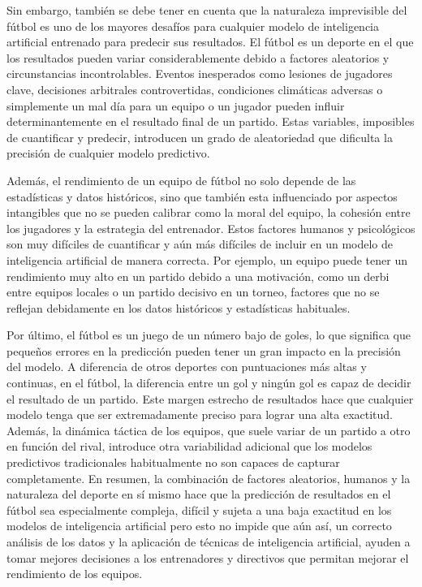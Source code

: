 Sin embargo, también se debe tener en cuenta que la naturaleza imprevisible del fútbol es uno de los mayores desafíos para cualquier modelo de inteligencia artificial entrenado para predecir sus resultados. El fútbol es un deporte en el que los resultados pueden variar considerablemente debido a factores aleatorios y circunstancias incontrolables. Eventos inesperados como lesiones de jugadores clave, decisiones arbitrales controvertidas, condiciones climáticas adversas o simplemente un mal día para un equipo o un jugador pueden influir determinantemente en el resultado final de un partido. Estas variables, imposibles de cuantificar y predecir, introducen un grado de aleatoriedad que dificulta la precisión de cualquier modelo predictivo.

Además, el rendimiento de un equipo de fútbol no solo depende de las estadísticas y datos históricos, sino que también esta influenciado por aspectos intangibles que no se pueden calibrar como la moral del equipo, la cohesión entre los jugadores y la estrategia del entrenador. Estos factores humanos y psicológicos son muy difíciles de cuantificar y aún más difíciles de incluir en un modelo de inteligencia artificial de manera correcta. Por ejemplo, un equipo puede tener un rendimiento muy alto en un partido debido a una motivación, como un derbi entre equipos locales o un partido decisivo en un torneo, factores que no se reflejan debidamente en los datos históricos y estadísticas habituales.

Por último, el fútbol es un juego de un número bajo de goles, lo que significa que pequeños errores en la predicción pueden tener un gran impacto en la precisión del modelo. A diferencia de otros deportes con puntuaciones más altas y continuas, en el fútbol, la diferencia entre un gol y ningún gol es capaz de decidir el resultado de un partido. Este margen estrecho de resultados hace que cualquier modelo tenga que ser extremadamente preciso para lograr una alta exactitud. Además, la dinámica táctica de los equipos, que suele variar de un partido a otro en función del rival, introduce otra variabilidad adicional que los modelos predictivos tradicionales habitualmente no son capaces de capturar completamente. En resumen, la combinación de factores aleatorios, humanos y la naturaleza del deporte en sí mismo hace que la predicción de resultados en el fútbol sea especialmente compleja, difícil y sujeta a una baja exactitud en los modelos de inteligencia artificial pero esto no impide que aún así, un correcto análisis de los datos y la aplicación de técnicas de inteligencia artificial, ayuden a tomar mejores decisiones a los entrenadores y directivos que permitan mejorar el rendimiento de los equipos.



